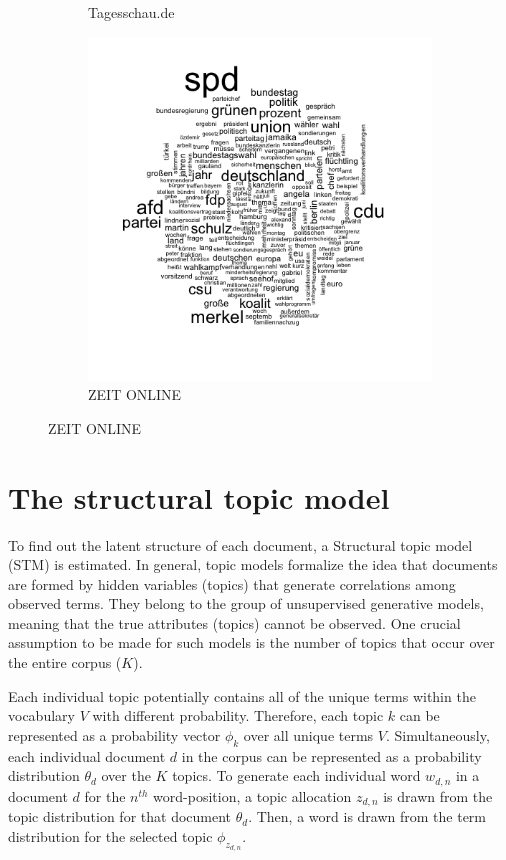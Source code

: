 \documentclass[12pt,a4paper,notitlepage]{article}
\begin{document}
\begin{figure}[H]
\begin{center}
\begin{subfigure}[normla]{0.3\textwidth}
			\caption{Tagesschau.de}
		\end{subfigure}
		\begin{subfigure}[normla]{0.3\textwidth}
			\includegraphics[width=\textwidth]{../figs/wordcloud_ZEITONLINE.png}
			\caption{ZEIT ONLINE}
		\end{subfigure}
	\end{center}
\end{figure}
 
\section{The structural topic model}\label{ch_model}

To find out the latent structure of each document, a Structural topic model (STM) is estimated. In general, topic models formalize the idea that documents are formed by hidden variables (topics) that generate correlations among observed terms. They belong to the group of unsupervised generative models, meaning that the true attributes (topics) cannot be observed. One crucial assumption to be made for such models is the number of topics that occur over the entire corpus ($K$). 

Each individual topic potentially contains all of the unique terms within the vocabulary $V$ with different probability. Therefore, each topic $k$ can be represented as a probability vector $\phi_k$ over all unique terms $V$. Simultaneously, each individual document $d$ in the corpus can be represented as a probability distribution $\theta_d$ over the $K$ topics. To generate each individual word $w_{d,n}$ in a document $d$ for the $n^{th}$ word-position, a topic allocation $z_{d,n}$ is drawn from the topic distribution for that document $\theta_d$. Then, a word is drawn from the term distribution for the selected topic $\phi_{z_{d,n}}$.
\end{document}
